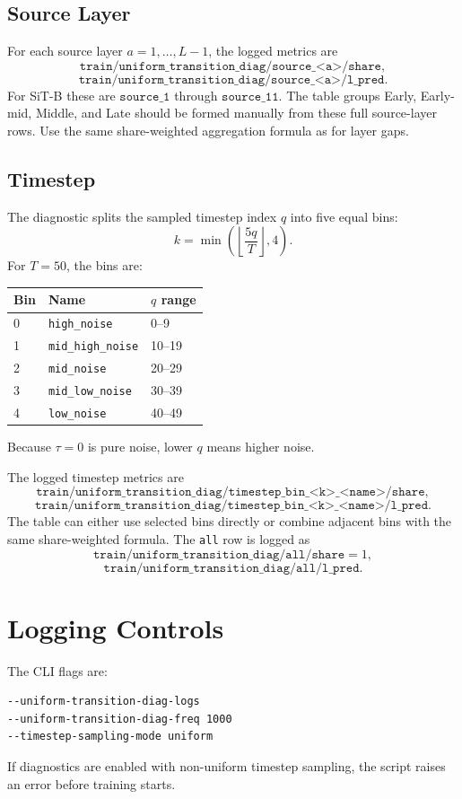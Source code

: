 \documentclass[11pt]{article}
\begin{document}
\subsection{Source Layer}
For each source layer \(a=1,\ldots,L-1\), the logged metrics are
\[
\texttt{train/uniform\_transition\_diag/source\_<a>/share},
\]
\[
\texttt{train/uniform\_transition\_diag/source\_<a>/l\_pred}.
\]
For SiT-B these are \(\texttt{source\_1}\) through \(\texttt{source\_11}\).
The table groups Early, Early-mid, Middle, and Late should be formed manually
from these full source-layer rows. Use the same share-weighted aggregation
formula as for layer gaps.

\subsection{Timestep}
The diagnostic splits the sampled timestep index \(q\) into five equal bins:
\[
k=\min\left(\left\lfloor\frac{5q}{T}\right\rfloor,4\right).
\]
For \(T=50\), the bins are:
\begin{center}
\begin{tabular}{lll}
\toprule
Bin & Name & \(q\) range \\
\midrule
0 & \texttt{high\_noise} & 0--9 \\
1 & \texttt{mid\_high\_noise} & 10--19 \\
2 & \texttt{mid\_noise} & 20--29 \\
3 & \texttt{mid\_low\_noise} & 30--39 \\
4 & \texttt{low\_noise} & 40--49 \\
\bottomrule
\end{tabular}
\end{center}
Because \(\tau=0\) is pure noise, lower \(q\) means higher noise.

The logged timestep metrics are
\[
\texttt{train/uniform\_transition\_diag/timestep\_bin\_<k>\_<name>/share},
\]
\[
\texttt{train/uniform\_transition\_diag/timestep\_bin\_<k>\_<name>/l\_pred}.
\]
The table can either use selected bins directly or combine adjacent bins with
the same share-weighted formula. The \texttt{all} row is logged as
\[
\texttt{train/uniform\_transition\_diag/all/share}=1,
\]
\[
\texttt{train/uniform\_transition\_diag/all/l\_pred}.
\]

\section{Logging Controls}
The CLI flags are:
\begin{verbatim}
--uniform-transition-diag-logs
--uniform-transition-diag-freq 1000
--timestep-sampling-mode uniform
\end{verbatim}
If diagnostics are enabled with non-uniform timestep sampling, the script raises
an error before training starts.
\end{document}
